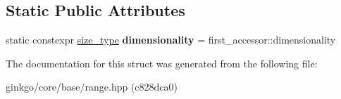 \subsection*{Static Public Attributes}
\begin{DoxyCompactItemize}
\item 
\mbox{\label{structgko_1_1accessor_1_1mmul__operation_ae8057c37357eae7ea962f11aab54a38e}} 
static constexpr \hyperlink{namespacegko_a6e5c95df0ae4e47aab2f604a22d98ee7}{size\+\_\+type} {\bfseries dimensionality} = first\+\_\+accessor\+::dimensionality
\end{DoxyCompactItemize}


The documentation for this struct was generated from the following file\+:\begin{DoxyCompactItemize}
\item 
ginkgo/core/base/range.\+hpp (c828dca0)\end{DoxyCompactItemize}
